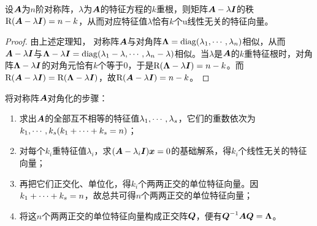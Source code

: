 \begin{frame}
\begin{tuilun}
  设$\boldsymbol{A}$为$n$阶对称阵，$\lambda$为$\boldsymbol{A}$的特征方程的$k$重根，则矩阵$\boldsymbol{A}-\lambda\boldsymbol{I}$的秩$\mathrm{R}(\boldsymbol{A}-\lambda\boldsymbol{I})=n-k$，从而对应特征值$\lambda$恰有$k$个u线性无关的特征向量。
\end{tuilun} \pause

\begin{proof}
  
  由上述定理知，
  对称阵$\boldsymbol{A}$与对角阵$\boldsymbol{\Lambda}=\mathrm{diag}(\lambda_1,\cdots,\lambda_n)$相似，从而$\boldsymbol{A}-\lambda\boldsymbol{I}$与$\boldsymbol{\Lambda}-\lambda\boldsymbol{I}=\mathrm{diag}(\lambda_1-\lambda,\cdots,\lambda_n-\lambda)$相似。当$\lambda$是$\boldsymbol{A}$的$k$重特征根时，对角阵$\boldsymbol{\Lambda}-\lambda\boldsymbol{I}$的对角元恰有$k$个等于$0$，于是$\mathrm{R}(\boldsymbol{\Lambda}-\lambda\boldsymbol{I})=n-k$。而$\mathrm{R}(\boldsymbol{A}-\lambda\boldsymbol{I})=\mathrm{R}(\boldsymbol{\Lambda}-\lambda\boldsymbol{I})$，故$\mathrm{R}(\boldsymbol{A}-\lambda\boldsymbol{I})=n-k$。
\end{proof}
\end{frame}

\begin{frame}
  将对称阵$\boldsymbol{A}$对角化的步骤：
  \begin{enumerate}
  \item 求出$\boldsymbol{A}$的全部互不相等的特征值$\lambda_1,\cdots,\lambda_s$，它们的重数依次为$k_1,\cdots,k_s(k_1+\cdots+k_s=n)$；\\[0.1in]
  \item 对每个$k_i$重特征值$\lambda_i$，求$(\boldsymbol{A}-\lambda_i\boldsymbol{I}){\boldsymbol{x}}=0$的基础解系，得$k_i$个线性无关的特征向量；\\[0.1in]
  \item 再把它们正交化、单位化，得$k_i$个两两正交的单位特征向量。因$k_1+\cdots+k_s=n$，故总共可得$n$个两两正交的单位特征向量；\\[0.1in]
  \item 将这$n$个两两正交的单位特征向量构成正交阵$\boldsymbol{Q}$，便有$\boldsymbol{Q}^{-1}\boldsymbol{A}\boldsymbol{Q}=\boldsymbol{\Lambda}$。
  \end{enumerate}
\end{frame}